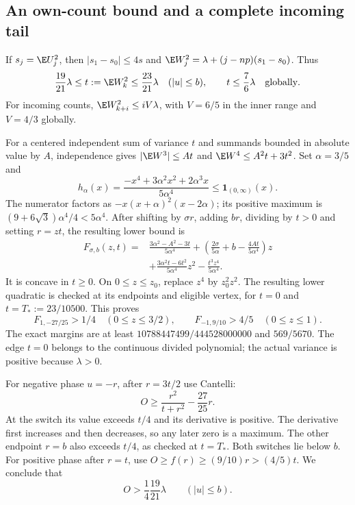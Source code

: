 \subsection{An own-count bound and a complete incoming tail}
If $s_j=\E U_j^2$, then $|s_1-s_0|\le4s$ and
$\E W_j^2=\lambda+(j-np)(s_1-s_0)$. Thus
\[
 \frac{19}{21}\lambda\le t:=\E W_k^2\le\frac{23}{21}\lambda
      \quad(|u|\le b),\qquad t\le\frac76\lambda\quad\text{globally}.
\]
For incoming counts, $\E W_{k+i}^2\le iV\lambda$, with $V=6/5$
in the inner range and $V=4/3$ globally.

For a centered independent sum of variance $t$ and summands bounded in
absolute value by $A$, independence gives
$|\E W^3|\le At$ and $\E W^4\le A^2t+3t^2$.
Set $\alpha=3/5$ and
\[
 h_\alpha(x)=\frac{-x^4+3\alpha^2x^2+2\alpha^3x}{5\alpha^4}
                                  \le\mathbf1_{(0,\infty)}(x).
\]
The numerator factors as $-x(x+\alpha)^2(x-2\alpha)$; its positive
maximum is $(9+6\sqrt3)\alpha^4/4<5\alpha^4$.
After shifting by $\sigma r$, adding $br$, dividing by $t>0$ and
setting $r=zt$, the resulting lower bound is
\begin{align*}
 F_{\sigma,b}(z,t)={}&\frac{3\alpha^2-A^2-3t}{5\alpha^4}
 +\left(\frac{2\sigma}{5\alpha}+b-\frac{4At}{5\alpha^4}\right)z\\
 &+\frac{3\alpha^2t-6t^2}{5\alpha^4}z^2
       -\frac{t^3z^4}{5\alpha^4}.
\end{align*}
It is concave in $t\ge0$. On $0\le z\le z_0$, replace $z^4$ by
$z_0^2z^2$. The resulting lower quadratic is checked at its endpoints
and eligible vertex, for $t=0$ and $t=T_*:=23/10500$. This proves
\[
 F_{1,-27/25}>1/4\quad(0\le z\le3/2),\qquad
 F_{-1,9/10}>4/5\quad(0\le z\le1).
\]
The exact margins are at least
$10788447499/444528000000$ and $569/5670$.
The edge $t=0$ belongs to the continuous divided polynomial; the actual
variance is positive because $\lambda>0$.

For negative phase $u=-r$, after $r=3t/2$ use Cantelli:
\[
 O\ge\frac{r^2}{t+r^2}-\frac{27}{25}r.
\]
At the switch its value exceeds $t/4$ and its derivative is positive.
The derivative first increases and then decreases, so any later zero
is a maximum. The other endpoint $r=b$ also exceeds $t/4$, as checked
at $t=T_*$. Both switches lie below $b$. For positive phase after
$r=t$, use $O\ge f(r)\ge(9/10)r>(4/5)t$. We conclude that
\begin{equation}\label{ap:own}
                   O>\frac14\frac{19}{21}\lambda
                   \qquad (|u|\le b).
\end{equation}

